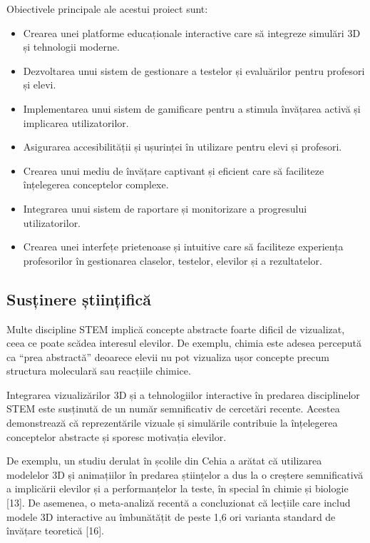Obiectivele principale ale acestui proiect sunt:
\begin{itemize}
    \item Crearea unei platforme educaționale interactive care să integreze simulări 3D și tehnologii moderne.
    \item Dezvoltarea unui sistem de gestionare a testelor și evaluărilor pentru profesori și elevi.
    \item Implementarea unui sistem de gamificare pentru a stimula învățarea activă și implicarea utilizatorilor.
    \item Asigurarea accesibilității și ușurinței în utilizare pentru elevi și profesori.
    \item Crearea unui mediu de învățare captivant și eficient care să faciliteze înțelegerea conceptelor complexe.
    \item Integrarea unui sistem de raportare și monitorizare a progresului utilizatorilor.
    \item Crearea unei interfețe prietenoase și intuitive care să faciliteze experiența profesorilor în gestionarea
     claselor, testelor, elevilor și a rezultatelor.
\end{itemize}



\subsection{Susținere științifică}
\label{sub-sec:proj-scientific-support}

Multe discipline STEM implică concepte abstracte foarte dificil de vizualizat, ceea ce poate scădea interesul elevilor.
De exemplu, chimia este adesea percepută ca “prea abstractă” deoarece elevii nu pot vizualiza ușor concepte precum
structura moleculară sau reacțiile chimice. 

Integrarea vizualizărilor 3D și a tehnologiilor interactive în predarea disciplinelor STEM este susținută de un
număr semnificativ de cercetări recente. Acestea demonstrează că reprezentările vizuale și simulările contribuie
la înțelegerea conceptelor abstracte și sporesc motivația elevilor.

De exemplu, un studiu derulat în școlile din Cehia a arătat că utilizarea modelelor 3D și animațiilor în predarea
științelor a dus la o creștere semnificativă a implicării elevilor și a performanțelor la teste,
în special în chimie și biologie [13]. De asemenea, o meta-analiză recentă a concluzionat că lecțiile
care includ modele 3D interactive au îmbunătățit de peste 1,6 ori varianta standard de învățare teoretică [16].

